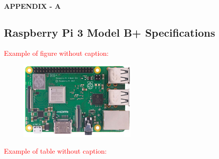 \newpage
\thispagestyle{empty}
\begin{center}
    {\bfseries \hypertarget{appendixa}{APPENDIX - A} }
    \vspace{1\baselineskip}
\end{center}

\subsection*{Raspberry Pi 3 Model B+ Specifications} 

    \noindent \textcolor{red}{Example of figure without caption:}
    \begin{figure}[h]
        \centering
        \includegraphics{Images/rpi3-modelB.png}
    \end{figure}



    \noindent \textcolor{red}{Example of table without caption:}
    


\clearpage{}